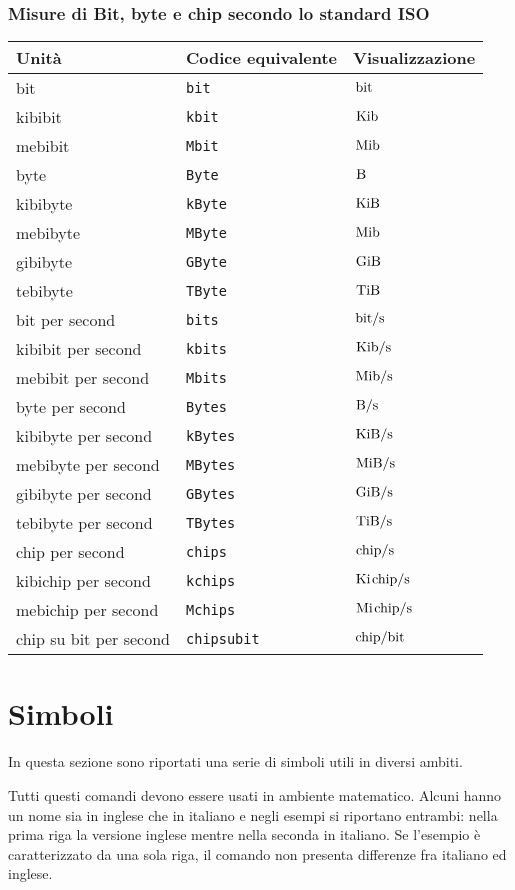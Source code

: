 \documentclass[11pt,a4paper,openany]{book}
\newcommand*{\cs}[1]{\texttt{\char92#1}}
\begin{document}
\subsubsection{Misure di Bit, byte e chip secondo lo standard ISO}
\begin{center}
\begin{tabular}{lll}
\toprule
Unità & Codice equivalente & Visualizzazione\\
\midrule
bit & \cs{bit} & $\,\mathrm{bit}$\\
kibibit & \cs{kbit} & $\,\mathrm{Kib}$ \\
mebibit & \cs{Mbit} & $\,\mathrm{Mib}$\\
byte & \cs{Byte} & $\,\mathrm{B}$\\
kibibyte & \cs{kByte} & $\,\mathrm{KiB}$ \\
mebibyte & \cs{MByte} & $\,\mathrm{Mib}$\\
gibibyte & \cs{GByte}	&	$\,\mathrm{GiB}$	\\
tebibyte & \cs{TByte}  & $\,\mathrm{TiB}$ \\
bit per second & \cs{bits} & $\,\mathrm{bit/s}$\\
kibibit per second & \cs{kbits} & $\,\mathrm{Kib/s}$ \\
mebibit per second & \cs{Mbits} & $\,\mathrm{Mib/s}$\\
byte per second & \cs{Bytes} & $\,\mathrm{B/s}$\\
kibibyte per second & \cs{kBytes} & $\,\mathrm{KiB/s}$ \\
mebibyte per second & \cs{MBytes} & $\,\mathrm{MiB/s}$\\
gibibyte per second & \cs{GBytes}	& $\,\mathrm{GiB/s}$\\
tebibyte per second & \cs{TBytes}	& $\,\mathrm{TiB/s}$\\
chip per second & \cs{chips} & $\,\mathrm{chip/s}$\\
kibichip per second & \cs{kchips} & $\,\mathrm{Ki\mkern2mu chip/s}$ \\
mebichip per second & \cs{Mchips} & $\,\mathrm{Mi\mkern2mu chip/s}$\\
chip su bit per second & \cs{chipsubit} & $\,\mathrm{chip/bit}$\\
\bottomrule
\end{tabular}
\end{center}
\section{Simboli}\label{sec:simboli}
In questa sezione sono riportati una serie di simboli utili in diversi ambiti.

Tutti questi comandi devono essere usati in ambiente matematico. Alcuni hanno un nome sia in inglese che in italiano e negli esempi si riportano entrambi: nella prima riga la versione inglese mentre nella seconda in italiano. Se l'esempio è caratterizzato da una sola riga, il comando non presenta differenze fra italiano ed inglese.
\end{document}
